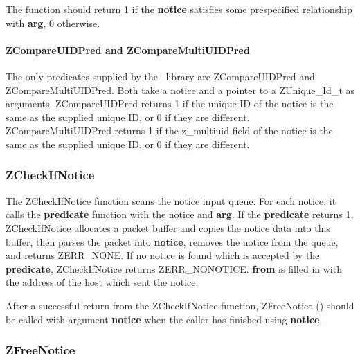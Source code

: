 \noindent The function should return 1 if the {\bf notice} satisfies
some prespecified relationship with {\bf arg}, 0 otherwise.

\paragraph{ZCompareUIDPred and ZCompareMultiUIDPred}
\label{ZCompareUIDPred}
\label{ZCompareMultiUIDPred}

The only predicates supplied by the \Zephyr\ library are ZCompareUIDPred
and ZCompareMultiUIDPred.  Both take a notice and a pointer to a
ZUnique_Id_t as arguments.  ZCompareUIDPred returns 1 if the unique ID
of the notice is the same as the supplied unique ID, or 0 if they are
different.  ZCompareMultiUIDPred returns 1 if the z_multiuid field of
the notice is the same as the supplied unique ID, or 0 if they are
different.

\subsubsection{ZCheckIfNotice}
\label{ZCheckIfNotice}

\etemplate
{}

The ZCheckIfNotice function scans the notice input queue.  For each
notice, it calls the {\bf predicate} function with the notice and {\bf
arg}.  If the {\bf predicate} returns 1, ZCheckIfNotice allocates a
packet buffer and copies the notice data into this buffer, then parses
the packet into {\bf notice}, removes the notice from the queue, and
returns ZERR_NONE.  If no notice is found which is accepted by the {\bf
predicate}, ZCheckIfNotice returns ZERR_NONOTICE.  {\bf *from} is filled
in with the address of the host which sent the notice.

After a successful return from the ZCheckIfNotice function,
ZFreeNotice () should be called with argument {\bf
notice} when the caller has finished using {\bf notice}.

\subsubsection{ZFreeNotice}
\label{ZFreeNotice}

